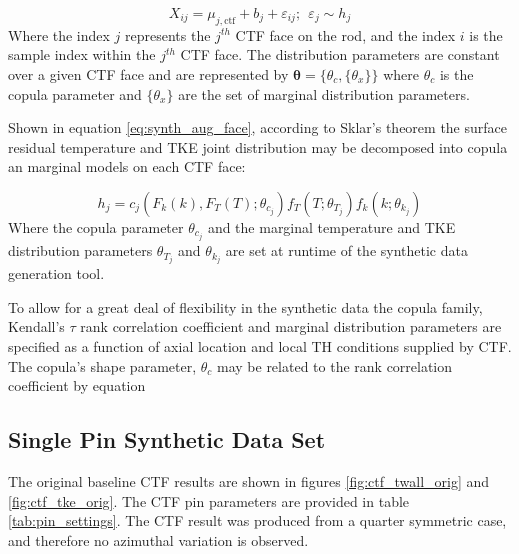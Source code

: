 \begin{equation}
    X_{ij} = \mu_{j,\mathrm{ctf}} + b_j + \varepsilon_{ij};\ \   \varepsilon_{j} \sim h_j
    \label{eq:synth_aug_discrete}
\end{equation}
Where the index $j$ represents the $j^{th}$ CTF face on the rod, and the index $i$ is the sample index within the $j^{th}$ CTF face.  The distribution parameters are constant over a given CTF face and are represented by $\bm \theta = \{\theta_c, \{\theta_x\}\}$ where $\theta_c$ is the copula parameter and  $\{\theta_x\}$ are the set of marginal distribution parameters.

Shown in equation \ref{eq:synth_aug_face}, according to Sklar's theorem the surface residual temperature and TKE joint distribution may be decomposed into copula an marginal models on each CTF face:

\begin{equation}
    h_j = c_j(F_k(k), F_T(T); \theta_{c_j}) f_{T}(T; \theta_{T_j}) f_{k}(k; \theta_{k_j})
    \label{eq:synth_aug_face}
\end{equation}
Where the copula parameter $\theta_{c_j}$ and the marginal temperature and TKE distribution parameters $\theta_{T_j}$ and $\theta_{k_j}$ are set at runtime of the synthetic data generation tool.

To allow for a great deal of flexibility in the synthetic data the copula family, Kendall's $\tau$ rank correlation coefficient and marginal distribution parameters are specified as a function of axial location and local TH conditions supplied by CTF.  The copula's shape parameter, $\theta_c$ may be related to the rank correlation coefficient by equation %


\subsection{Single Pin Synthetic Data Set}

The original baseline CTF results are shown in figures \ref{fig:ctf_twall_orig} and \ref{fig:ctf_tke_orig}.  The CTF pin parameters are provided in table \ref{tab:pin_settings}.  The CTF result was produced from a quarter symmetric case, and therefore no azimuthal variation is observed.

